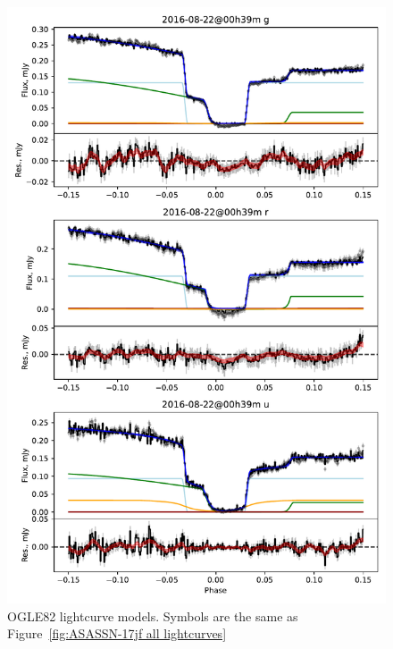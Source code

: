 \begin{figure}
    \centering
    \includegraphics[width=\textwidth]{figures/results/OGLE82/OGLE82_1.pdf}
    \caption{OGLE82 lightcurve models. Symbols are the same as Figure~\ref{fig:ASASSN-17jf all lightcurves}}
    \label{fig:OGLE82 all lightcurves}
\end{figure}
